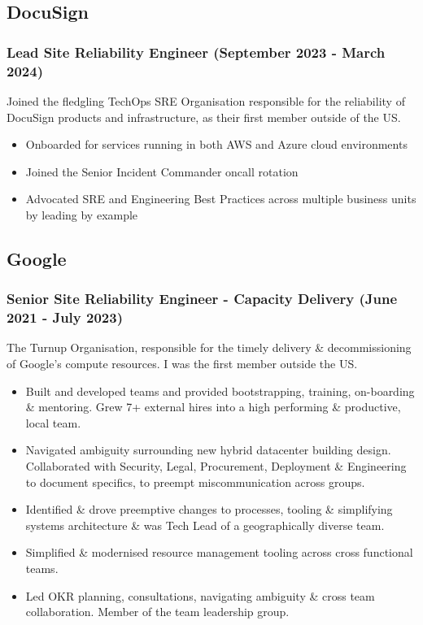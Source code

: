 \documentclass[a4paper, 10pt] {article}
\begin{document}
\subsection*{DocuSign}

\subsubsection*{Lead Site Reliability Engineer (September 2023 - March 2024)}

Joined the fledgling TechOps SRE Organisation responsible for the reliability of DocuSign products and infrastructure,
as their first member outside of the US.

\begin{itemize}[noitemsep]
	\item Onboarded for services running in both AWS and Azure cloud environments
 	\item Joined the Senior Incident Commander oncall rotation
 	\item Advocated SRE and Engineering Best Practices across multiple business units by leading by example
\end{itemize}

\subsection*{Google}

\subsubsection*{Senior Site Reliability Engineer - Capacity Delivery (June 2021 - July 2023)}

The Turnup Organisation, responsible for the timely delivery \&
decommissioning of Google's compute resources. I was the first member
outside the US.

\begin{itemize}[noitemsep]
	\item Built and developed teams and provided bootstrapping, training, 
		on-boarding \& mentoring. Grew 7+ external hires into a high performing \&
		productive, local team.
  	\item Navigated ambiguity surrounding new hybrid datacenter building design.
		Collaborated with Security, Legal, Procurement, Deployment \& 
		Engineering to document specifics, to preempt miscommunication across groups.
	\item Identified \& drove preemptive changes to processes, tooling \& simplifying systems
		architecture \& was Tech Lead of a geographically diverse team.
	\item Simplified \& modernised resource management tooling across cross functional teams.
	\item Led OKR planning, consultations, navigating ambiguity \& cross team collaboration. Member
		of the team leadership group.
\end{itemize}
\end{document}
